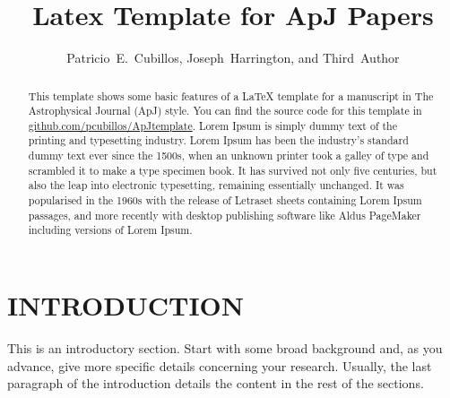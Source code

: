 





\title{Latex Template for ApJ Papers}

\author{Patricio~E.~Cubillos,
Joseph~Harrington,
and
Third~Author
}



\begin{abstract}
  This template shows some basic features of a LaTeX template for a
  manuscript in The Astrophysical Journal (ApJ) style.  You can find
  the source code for this template in
  \href{https://github.com/pcubillos/ApJtemplate}
  {github.com/pcubillos/ApJtemplate}.
  Lorem Ipsum is simply dummy text of the printing and typesetting
  industry. Lorem Ipsum has been the industry's standard dummy text ever
  since the 1500s, when an unknown printer took a galley of type and
  scrambled it to make a type specimen book. It has survived not only
  five centuries, but also the leap into electronic typesetting,
  remaining essentially unchanged. It was popularised in the 1960s with
  the release of Letraset sheets containing Lorem Ipsum passages, and
  more recently with desktop publishing software like Aldus PageMaker
  including versions of Lorem Ipsum.
\end{abstract}



\section{INTRODUCTION}
\label{introduction}

This is an introductory section.  Start with some broad background and,
as you advance, give more specific details concerning your research.
Usually, the last paragraph of the introduction details the content in
the rest of the sections.

